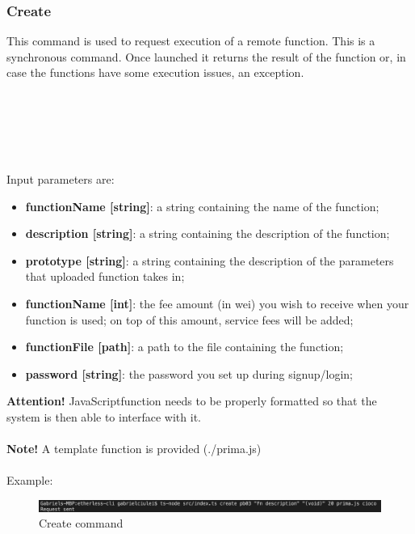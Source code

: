 \subsubsection{Create}
This command is used to request execution of a remote function. This is a synchronous command. Once launched it returns the result of the function or, in case the functions have some execution issues, an exception.\\\\
\centerline{}\\\\
\\\\
Input parameters are:
\begin{itemize}
	\item \textbf{functionName [string]}: a string containing the name of the function;
	\item \textbf{description [string]}: a string containing the description of the function;
	\item \textbf{prototype [string]}: a string containing the description of the parameters that uploaded function takes in;
	\item \textbf{functionName [int]}: the fee amount (in wei) you wish to receive when your function is used; on top of this amount, service fees will be added;
	\item \textbf{functionFile [path]}: a path to the file containing the function;
	\item \textbf{password [string]}: the password you set up during signup/login;
\end{itemize}
\textbf{Attention!} JavaScript\glo function needs to be properly formatted so that the system is then able to interface with it.\\\\
\textbf{Note!} A template function is provided (./prima.js)\\\\
Example:
\begin{figure}[h]
	\centering
	\includegraphics[width=\textwidth]{res/img/Screenshot_deploy.png}
	\caption{Create command}
\end{figure}

